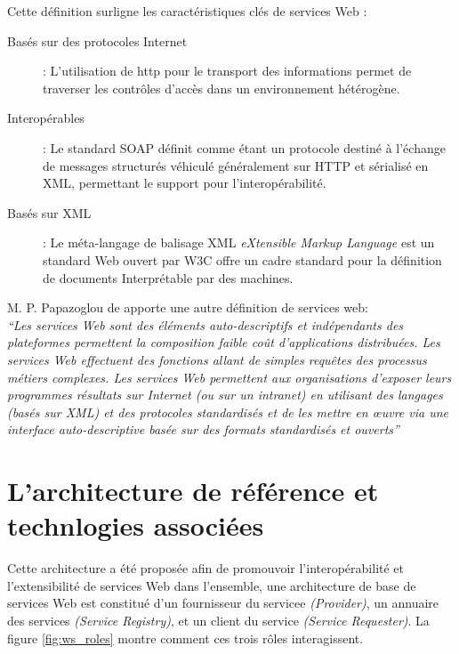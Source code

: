Cette définition surligne les caractéristiques clés de services Web
\cite{fremantle2002enterprise}:

\renewcommand{\descriptionlabel}[1]{\hspace{1cm}\textbullet~\textsf{#1}}
\begin{description}
\item[Basés sur des protocoles Internet] : L'utilisation de
  \acrshort{http} pour le transport des informations permet de
  traverser les contrôles d'accès dans un environnement hétérogène.

\item[Interopérables] : Le standard \textsc{SOAP} \cite{box2000simple}
  définit comme étant un protocole destiné à l'échange de messages
  structurés véhiculé généralement sur \textsc{HTTP} et sérialisé en
  \textsc{XML}, permettant le support pour l'interopérabilité.

\item[Basés sur XML] : Le méta-langage de balisage \textsc{XML}
  \textit{eXtensible Markup Language} est un standard Web ouvert par
  \textsc{W3C} \cite{bray1998extensible} offre un cadre standard pour
  la définition de documents Interprétable par des machines.
\end{description}

M. P. Papazoglou \cite{papazoglou2003service} de apporte une
autre définition de services web:\\ \emph{``Les services Web sont
des éléments auto-descriptifs et indépendants des plateformes
permettent la composition faible coût d’applications
distribuées. Les services Web effectuent des fonctions allant de
simples requêtes des processus métiers complexes. Les services Web
permettent aux organisations d’exposer leurs programmes résultats
sur Internet (ou sur un intranet) en utilisant des langages (basés
sur XML) et des protocoles standardisés et de les mettre en œuvre
via une interface auto-descriptive basée sur des formats
standardisés et ouverts''}


% 

\section{L'architecture de référence et technlogies associées}
\label{sec:reference-arch}
Cette architecture a été proposée afin de promouvoir
l'interopérabilité et l'extensibilité de services Web dans
l'ensemble, une architecture de base de services Web est constitué
d'un fournisseur du servicee \textit{(Provider)}, un annuaire des
services \textit{(Service Registry)}, et un client du service
\textit{(Service Requester)}. La figure \ref{fig:ws_roles} montre
comment ces trois rôles interagissent.

